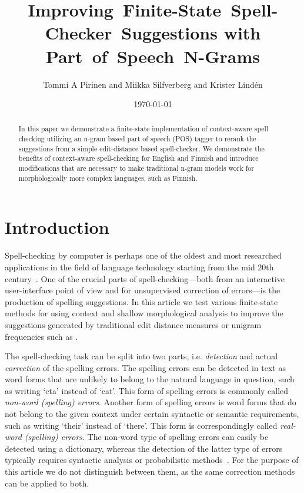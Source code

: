\documentclass{llncs}
\begin{document}
\title{Improving~Finite-State~Spell-Checker~Suggestions with 
Part~of~Speech~N-Grams}

\author{Tommi A Pirinen and Miikka Silfverberg and Krister Lind\'{e}n}


\date{\today}

\maketitle

\begin{abstract}
  In this paper we demonstrate a finite-state implementation of context-aware
  spell checking utilizing an n-gram based part of speech (POS) tagger to rerank the
  suggestions from a simple edit-distance based spell-checker. We
  demonstrate the benefits of context-aware spell-checking for English and Finnish and
  introduce modifications that are necessary to make traditional n-gram
  models work for morphologically more complex languages, such as Finnish.
\end{abstract}

\section{Introduction}

Spell-checking by computer is perhaps one of the oldest and most researched
applications in the field of language technology starting from the mid 20th
century~\cite{damerau/1964}. One of the crucial parts of spell-checking---both
from an interactive user-interface point of view and for unsupervised correction
of errors---is the production of spelling suggestions.  In this article we test
various finite-state methods for using context and shallow morphological
analysis to improve the suggestions generated by traditional edit distance
measures or unigram frequencies such as \cite{pirinen/2010/lrec}.

The spell-checking task can be split into two parts, i.e. \emph{detection} and
actual \emph{correction} of the spelling errors. The spelling errors can be
detected in text as word forms that are unlikely to belong to the
natural language in question, such as writing `cta' instead of `cat'. This form
of spelling errors is commonly called \emph{non-word (spelling) errors}.
Another form of spelling errors is word forms that do not belong to the given
context under certain syntactic or semantic requirements, such as writing
`their' instead of `there'. This form is correspondingly called \emph{real-word
(spelling) errors}. The non-word type of spelling errors can easily be detected
using a dictionary, whereas the detection of the latter type of errors typically
requires syntactic analysis or probabilistic methods~\cite{mitton/2009}. For
the purpose of this article we do not distinguish between them, as the same
correction methods can be applied to both.
\end{document}
